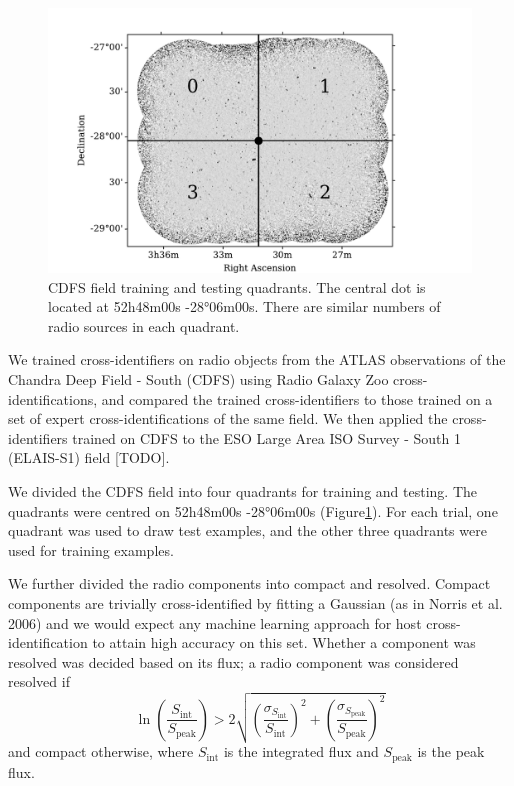 \documentclass[fleqn,usenatbib,usedcolumn]{mnras}
\newcommand{\text}{\mathrm}
\begin{document}
    \begin{figure}[htbp]
    \centering
    \includegraphics[width=\columnwidth]{images/quadrants.pdf}
    \caption{CDFS field training and testing quadrants. The central dot is
    located at 52h48m00s -28°06m00s. There are similar numbers of radio
    sources in each quadrant.\label{fig:quadrants}}
    \end{figure}

    We trained cross-identifiers on radio objects from the ATLAS
    observations of the Chandra Deep Field - South (CDFS) using Radio Galaxy
    Zoo cross-identifications, and compared the trained cross-identifiers to
    those trained on a set of expert cross-identifications of the same
    field. We then applied the cross-identifiers trained on CDFS to the ESO
    Large Area ISO Survey - South 1 (ELAIS-S1) field {[}TODO{]}.

    We divided the CDFS field into four quadrants for training and testing.
    The quadrants were centred on 52h48m00s -28°06m00s
    ({Figure}\ref{fig:quadrants}). For each trial, one quadrant
    was used to draw test examples, and the other three quadrants were used
    for training examples.

    We further divided the radio components into compact and resolved.
    Compact components are trivially cross-identified by fitting a Gaussian
    (as in Norris et al. 2006) and we would expect any machine learning
    approach for host cross-identification to attain high accuracy on this
    set. Whether a component was resolved was decided based on its flux; a
    radio component was considered resolved if \[
        \ln \left(\frac{S_{\text{int}}}{S_{\text{peak}}}\right) > 2\sqrt{\left(\frac{\sigma_{S_{\text{int}}}}{S_{\text{int}}}\right)^2 + \left(\frac{\sigma_{S_{\text{peak}}}}{S_{\text{peak}}}\right)^2}
    \] and compact otherwise, where \(S_{\text{int}}\) is the integrated
    flux and \(S_{\text{peak}}\) is the peak flux.
\end{document}
